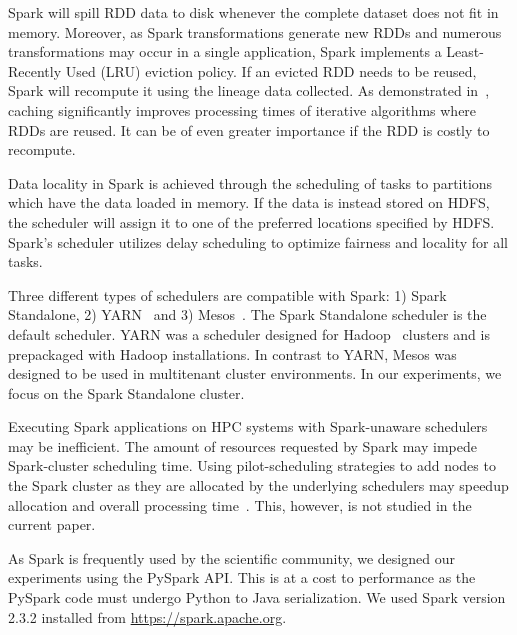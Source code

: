 \documentclass{IEEEtran}
\begin{document}
Spark will spill RDD data to disk whenever the complete dataset does not fit in
memory. Moreover, as Spark transformations generate new RDDs and numerous 
transformations may occur in a single application, Spark implements a Least-Recently Used (LRU) eviction
policy. If an evicted RDD needs to be reused, Spark will recompute it using the
lineage data collected. As demonstrated in~\cite{freeman2014mapping}, caching significantly improves processing times of iterative algorithms where 
RDDs are reused. It can be of even greater importance if the RDD is costly to 
recompute.

Data locality in Spark is achieved through the scheduling of tasks to partitions 
which have the
data loaded in memory. If the data is instead stored on HDFS, the scheduler will
assign it to one of the preferred locations specified by HDFS. Spark's scheduler
utilizes delay scheduling to optimize fairness and locality for all tasks.

Three different types of schedulers are compatible with Spark: 1) Spark 
Standalone, 2) YARN~\cite{vavilapalli2013apache} and 3) Mesos~\cite{hindman2011mesos}. The Spark Standalone
scheduler is the default scheduler. YARN was a scheduler designed for Hadoop~\cite{white2012hadoop}
clusters and is prepackaged with Hadoop installations. In contrast to YARN, 
Mesos was designed to be used in multitenant cluster environments. In our experiments,
we focus on the Spark Standalone cluster.

Executing Spark applications on HPC systems with Spark-unaware schedulers may
be inefficient. The amount of resources requested by Spark may impede 
Spark-cluster scheduling time. Using pilot-scheduling strategies to add 
nodes to the Spark cluster as they are allocated by the underlying 
schedulers may speedup allocation and overall processing time~\cite{paraskevakos2018pilot}. This, however, is not studied in the 
current paper.

As Spark is frequently used by the scientific community, we designed 
our experiments using the PySpark API. This is at a cost to performance 
as the PySpark code must undergo Python to Java serialization. We used Spark
version 2.3.2 installed from \url{https://spark.apache.org}.


\end{document}
